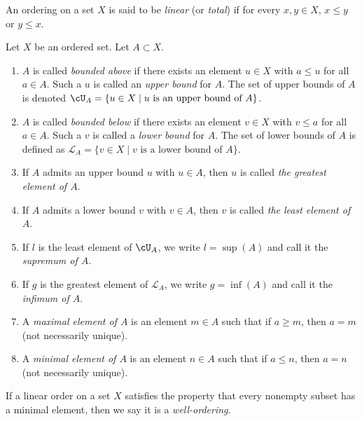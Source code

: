     \begin{definition}
        An ordering on a set $X$ is said to be \textit{linear} (or \textit{total}) if for every $x,y \in X$, $x \leq y$ or $y \leq x$.
    \end{definition}

    \begin{definition}
        Let $X$ be an ordered set. Let $A \subset X$.
        \begin{enumerate}[label = (\arabic*),itemsep=1pt,topsep=3pt]
            \item $A$ is called \textit{bounded above} if there exists an element $u \in X$ with $a \leq u$ for all $a \in A$. Such a $u$ is called an \textit{upper bound} for $A$. The set of upper bounds of $A$ is denoted $\cU_A = \{u \in X \mid \text{$u$ is an upper bound of $A$}\}$.
            \item $A$ is called \textit{bounded below} if there exists an element $v \in X$ with $v \leq a$ for all $a \in A$. Such a $v$ is called a \textit{lower bound} for $A$. The set of lower bounds of $A$ is defined as $\mathscr{L}_A = \{v \in X \mid \text{$v$ is a lower bound of $A$}\}$.
            \item If $A$ admits an upper bound $u$ with $u \in A$, then $u$ is called \textit{the greatest element of $A$}.
            \item If $A$ admits a lower bound $v$ with $v \in A$, then $v$ is called \textit{the least element of $A$}.
            \item If $l$ is the least element of $\cU_A$, we write $l = \sup{(A)}$ and call it the \textit{supremum of $A$}.
            \item If $g$ is the greatest element of $\mathscr{L}_A$, we write $g = \inf{(A)}$ and call it the \textit{infimum of $A$}.
            \item A \textit{maximal element of $A$} is an element $m \in A$ such that if $a \geq m$, then $a = m$ (not necessarily unique).
            \item A \textit{minimal element of $A$} is an element $n \in A$ such that if $a \leq n$, then $a = n$ (not necessarily unique).
        \end{enumerate}
    \end{definition}

    \begin{definition}
        If a linear order on a set $X$ satisfies the property that every nonempty subset has a minimal element, then we say it is a \textit{well-ordering}.
    \end{definition}

